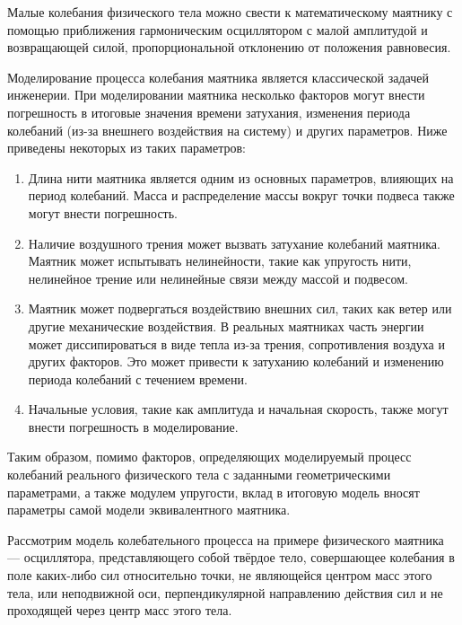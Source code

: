 {\begin{onehalfspace}
	
	Малые колебания физического тела можно свести к математическому маятнику с помощью приближения гармоническим осциллятором с малой амплитудой и возвращающей силой, пропорциональной отклонению от положения равновесия. 
 
    Моделирование процесса колебания маятника является классической задачей инженерии. При моделировании маятника несколько факторов могут внести погрешность в итоговые значения времени затухания, изменения периода колебаний (из-за внешнего воздействия на систему) и других параметров. Ниже приведены некоторых из таких параметров:

    \begin{enumerate} 
    
    \item  Длина нити маятника является одним из основных параметров, влияющих на период колебаний. Масса и распределение массы вокруг точки подвеса также могут внести погрешность.

    \item Наличие воздушного трения может вызвать затухание колебаний маятника. Маятник может испытывать нелинейности, такие как упругость нити, нелинейное трение или нелинейные связи между массой и подвесом.

    \item Маятник может подвергаться воздействию внешних сил, таких как ветер или другие механические воздействия. В реальных маятниках часть энергии может диссипироваться в виде тепла из-за трения, сопротивления воздуха и других факторов. Это может привести к затуханию колебаний и изменению периода колебаний с течением времени.

   \item Начальные условия, такие как амплитуда и начальная скорость, также могут внести погрешность в моделирование. 

    \end{enumerate}
    
    Таким образом, помимо факторов, определяющих моделируемый процесс колебаний реального физического тела с заданными геометрическими параметрами, а также модулем упругости, вклад в итоговую модель вносят параметры самой модели эквивалентного маятника.

    
    Рассмотрим модель колебательного процесса на примере физического маятника — осциллятора, представляющего собой твёрдое тело, совершающее колебания в поле каких-либо сил относительно точки, не являющейся центром масс этого тела, или неподвижной оси, перпендикулярной направлению действия сил и не проходящей через центр масс этого тела. 
    

\end{onehalfspace}}
